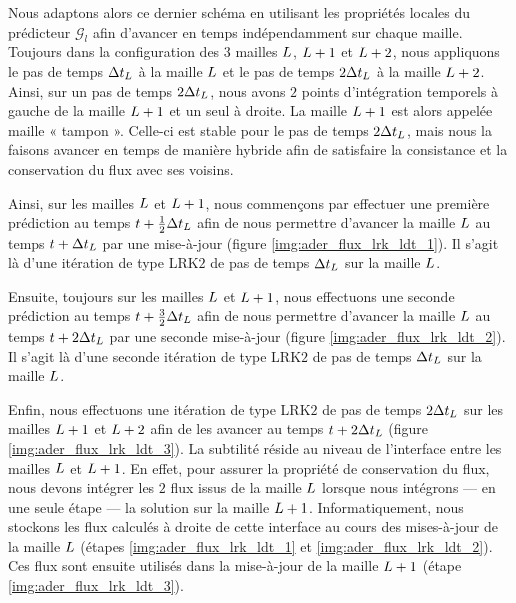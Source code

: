 Nous adaptons alors ce dernier schéma en utilisant
les propriétés locales du prédicteur $\mathcal{G}_l$
afin d'avancer en temps indépendamment sur chaque maille.
\\

Toujours dans la configuration des $3$ mailles $L$,
$L+1$ et $L+2$, nous appliquons le pas de temps
$\Delta t_L$ à la maille $L$ et le pas de temps
$2 \Delta t_L$ à la maille $L+2$.
Ainsi, sur un pas de temps $2 \Delta t_L$, nous avons $2$ points
d'intégration temporels à gauche de la maille $L+1$
et un seul à droite.
La maille $L+1$ est alors appelée maille « tampon ». Celle-ci
est stable pour le pas de temps $2 \Delta t_L$, mais nous la faisons
avancer en temps de manière hybride afin de satisfaire la consistance
et la conservation du flux avec ses voisins.

Ainsi, sur les mailles $L$ et $L+1$, nous commençons par
effectuer une première prédiction au temps $t + \frac{1}{2} \Delta t_L$
afin de nous permettre d'avancer la maille $L$
au temps $t + \Delta t_L$ par une mise-à-jour
(figure \ref{img:ader_flux_lrk_ldt_1}).
Il s'agit là d'une itération de type LRK$2$ de pas de temps $\Delta t_L$
sur la maille $L$.

Ensuite, toujours sur les mailles $L$ et $L+1$, nous effectuons
une seconde prédiction au temps $t + \frac{3}{2} \Delta t_L$
afin de nous permettre d'avancer la maille $L$
au temps $t + 2 \Delta t_L$ par une seconde mise-à-jour
(figure \ref{img:ader_flux_lrk_ldt_2}).
Il s'agit là d'une seconde itération de type LRK$2$ de pas de temps $\Delta t_L$ sur la maille $L$.

Enfin, nous effectuons une itération de type LRK$2$
de pas de temps $2 \Delta t_L$ sur 
les mailles $L+1$ et $L+2$ afin de les avancer au
temps $t + 2 \Delta t_L$ (figure \ref{img:ader_flux_lrk_ldt_3}).
La subtilité réside au niveau de l'interface entre les mailles
$L$ et $L+1$. En effet, pour assurer
la propriété de conservation du flux, nous devons intégrer
les $2$ flux issus de la maille $L$ lorsque nous
intégrons --- en une seule étape --- la solution sur la maille $L+1$.
Informatiquement, nous stockons les flux
calculés à droite de cette interface au cours des mises-à-jour
de la maille $L$ (étapes \ref{img:ader_flux_lrk_ldt_1} et \ref{img:ader_flux_lrk_ldt_2}). Ces flux sont ensuite utilisés dans la
mise-à-jour de la maille $L+1$ (étape \ref{img:ader_flux_lrk_ldt_3}).


